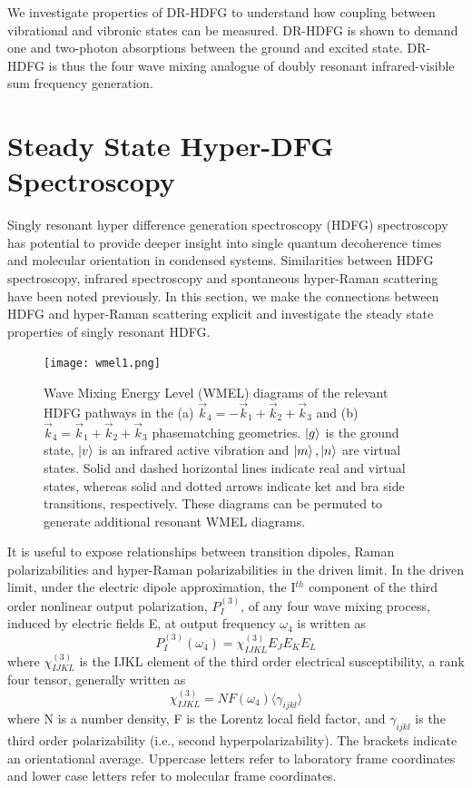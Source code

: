\documentclass[aip, jcp, reprint, onecolumn]{revtex4-2}
\begin{document}
We investigate properties of DR-HDFG to understand how coupling between vibrational and vibronic states can be measured.
DR-HDFG is shown to demand one and two-photon absorptions between the ground and excited state.
DR-HDFG is thus the four wave mixing analogue of doubly resonant infrared-visible sum frequency generation. \cite{Shen94}

\section{Steady State Hyper-DFG Spectroscopy}
Singly resonant hyper difference generation spectroscopy (HDFG) spectroscopy has potential to provide deeper insight into single quantum decoherence times and molecular orientation in condensed systems.
Similarities between HDFG spectroscopy, infrared spectroscopy and spontaneous hyper-Raman scattering have been noted previously. \cite{RN352, Bonn2024}
In this section, we make the connections between HDFG and hyper-Raman scattering explicit and investigate the steady state properties of singly resonant HDFG.

\begin{figure}[!htbp]
	\centering
	\texttt{[image: wmel1.png]}
	\caption{Wave Mixing Energy Level (WMEL) diagrams of the relevant HDFG pathways in the (a) $\vec{k}_4 = -\vec{k}_1 + \vec{k}_2 + \vec{k}_3$ and (b) $\vec{k}_4 = \vec{k}_1 + \vec{k}_2 + \vec{k}_3$ phasematching geometries. \cite{RN286, RN352}
	$\ket{g}$ is the ground state, $\ket{v}$ is an infrared active vibration and $\ket{m}, \ket{n}$ are virtual states.
	Solid and dashed horizontal lines indicate real and virtual states, whereas solid and dotted arrows indicate ket and bra side transitions, respectively. 
	These diagrams can be permuted to generate additional resonant WMEL diagrams.}
	\label{fig:sivewmel}
\end{figure}

It is useful to expose relationships between transition dipoles, Raman polarizabilities and hyper-Raman polarizabilities in the driven limit. \cite{Simpson2004, RN120}
In the driven limit, under the electric dipole approximation, the I$^{th}$ component of the third order nonlinear output polarization, ${P}^{(3)}_I$, of any four wave mixing process, induced by electric fields E, at output frequency $\omega_4$ is written as \cite{RN307}
\begin{equation} \label{polarization}
{P}^{(3)}_I (\omega_4)  = \chi^{(3)}_{IJKL} E_J E_K E_L 
\end{equation}
where $\chi^{(3)}_{IJKL}$ is the IJKL element of the third order electrical susceptibility, a rank four tensor, generally written as
\begin{equation}
	\chi^{(3)}_{IJKL} = NF(\omega_4) \langle \gamma_{ijkl} \rangle
\end{equation}
where N is a number density, F is the Lorentz local field factor, and $\gamma_{ijkl}$ is the third order polarizability (i.e., second hyperpolarizability). 
The brackets indicate an orientational average. 
Uppercase letters refer to laboratory frame coordinates and lower case letters refer to molecular frame coordinates.
\end{document}
